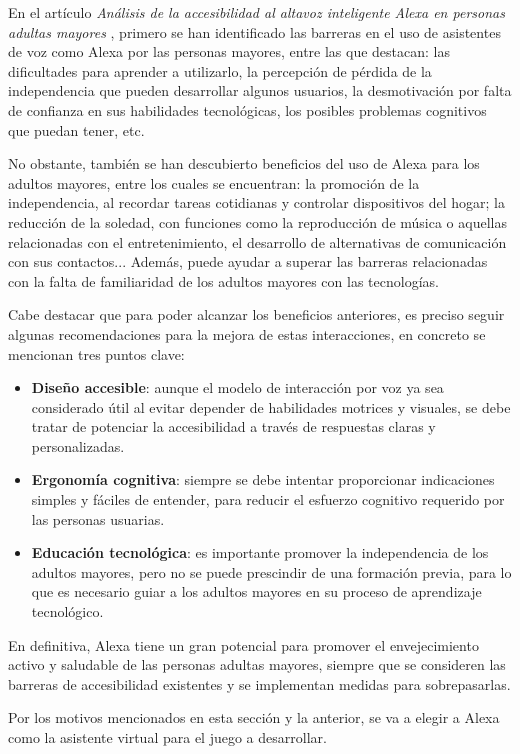 En el artículo \textit{Análisis de la accesibilidad al altavoz inteligente Alexa en personas adultas mayores} \parencite{tello2023analisis}, primero se han identificado las barreras en el uso de asistentes de voz como Alexa por las personas mayores, entre las que destacan: las dificultades para aprender a utilizarlo, la percepción de pérdida de la independencia que pueden desarrollar algunos usuarios, la desmotivación por falta de confianza en sus habilidades tecnológicas, los posibles problemas cognitivos que puedan tener, etc.

No obstante, también se han descubierto beneficios del uso de Alexa para los adultos mayores, entre los cuales se encuentran: la promoción de la independencia, al recordar tareas cotidianas y controlar dispositivos del hogar; la reducción de la soledad, con funciones como la reproducción de música o aquellas relacionadas con el entretenimiento, el desarrollo de alternativas de comunicación con sus contactos... Además, puede ayudar a superar las barreras relacionadas con la falta de familiaridad de los adultos mayores con las tecnologías.

Cabe destacar que para poder alcanzar los beneficios anteriores, es preciso seguir algunas recomendaciones para la mejora de estas interacciones, en concreto se mencionan tres puntos clave:
\begin{itemize}
	\item \textbf{Diseño accesible}: aunque el modelo de interacción por voz ya sea considerado útil al evitar depender de habilidades motrices y visuales, se debe tratar de potenciar la accesibilidad a través de respuestas claras y personalizadas.
	\item \textbf{Ergonomía cognitiva}: siempre se debe intentar proporcionar indicaciones simples y fáciles de entender, para reducir el esfuerzo cognitivo requerido por las personas usuarias.
	\item \textbf{Educación tecnológica}: es importante promover la independencia de los adultos mayores, pero no se puede prescindir de una formación previa, para lo que es necesario guiar a los adultos mayores en su proceso de aprendizaje tecnológico. 
\end{itemize} 

En definitiva, Alexa tiene un gran potencial para promover el envejecimiento activo y saludable de las personas adultas mayores, siempre que se consideren las barreras de accesibilidad existentes y se implementan medidas para sobrepasarlas.

Por los motivos mencionados en esta sección y la anterior, se va a elegir a Alexa como la asistente virtual para el juego a desarrollar.

